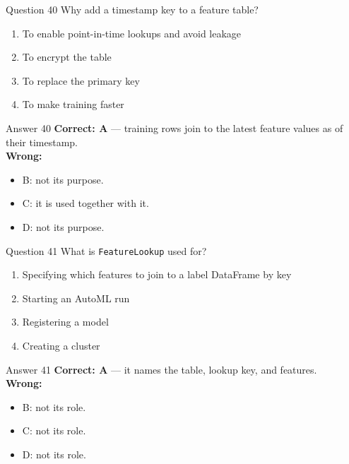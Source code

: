 \documentclass[aspectratio=169,11pt]{beamer}
\begin{document}
	\begin{frame}{Question 40}
		Why add a timestamp key to a feature table?
		\begin{enumerate}[label=\Alph*.]
			\item To enable point-in-time lookups and avoid leakage
			\item To encrypt the table
			\item To replace the primary key
			\item To make training faster
		\end{enumerate}
	\end{frame}
	\begin{frame}{Answer 40}
		\textbf{Correct: A} --- training rows join to the latest feature values as of their timestamp.\\
		\vspace{0.5em}
		\textbf{Wrong:}
		\begin{itemize}
			\item B: not its purpose.
			\item C: it is used together with it.
			\item D: not its purpose.
		\end{itemize}
	\end{frame}
	
	\begin{frame}{Question 41}
		What is \texttt{FeatureLookup} used for?
		\begin{enumerate}[label=\Alph*.]
			\item Specifying which features to join to a label DataFrame by key
			\item Starting an AutoML run
			\item Registering a model
			\item Creating a cluster
		\end{enumerate}
	\end{frame}
	\begin{frame}{Answer 41}
		\textbf{Correct: A} --- it names the table, lookup key, and features.\\
		\vspace{0.5em}
		\textbf{Wrong:}
		\begin{itemize}
			\item B: not its role.
			\item C: not its role.
			\item D: not its role.
		\end{itemize}
	\end{frame}
	
\end{document}
